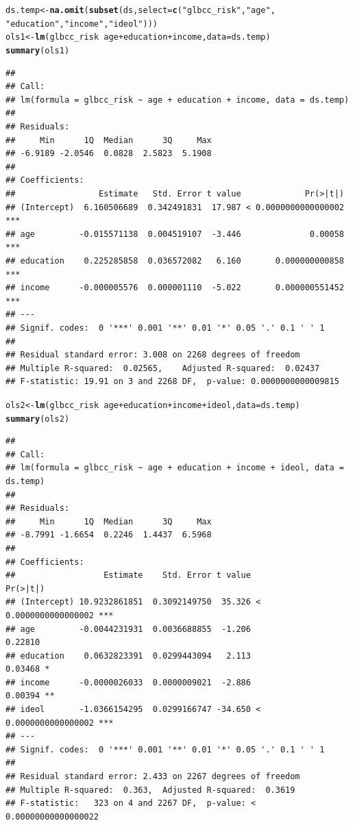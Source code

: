 \documentclass[11pt,openany]{book}\usepackage[]{graphicx}\usepackage[]{color}
\makeatletter
\newcommand{\hlstr}[1]{\textcolor[rgb]{0.192,0.494,0.8}{#1}}%
\newcommand{\hlopt}[1]{\textcolor[rgb]{0,0,0}{#1}}%
\newcommand{\hlstd}[1]{\textcolor[rgb]{0.345,0.345,0.345}{#1}}%
\newcommand{\hlkwb}[1]{\textcolor[rgb]{0.69,0.353,0.396}{#1}}%
\newcommand{\hlkwc}[1]{\textcolor[rgb]{0.333,0.667,0.333}{#1}}%
\newcommand{\hlkwd}[1]{\textcolor[rgb]{0.737,0.353,0.396}{\textbf{#1}}}%
\newenvironment{kframe}{%
 \def\at@end@of@kframe{}%
 \ifinner\ifhmode%
  \def\at@end@of@kframe{\end{minipage}}%
  \begin{minipage}{\columnwidth}%
 \fi\fi%
 \def\FrameCommand##1{\hskip\@totalleftmargin \hskip-\fboxsep
 \colorbox{shadecolor}{##1}\hskip-\fboxsep
     \hskip-\linewidth \hskip-\@totalleftmargin \hskip\columnwidth}%
 \MakeFramed {\advance\hsize-\width
   \@totalleftmargin\z@ \linewidth\hsize
   \@setminipage}}%
 {\par\unskip\endMakeFramed%
 \at@end@of@kframe}
\newenvironment{knitrout}{}{} %
\renewenvironment{knitrout}{\begin{singlespace}}{\end{singlespace}}
\makeatother
\begin{document}
\begin{knitrout}
\color{fgcolor}\begin{kframe}
\begin{alltt}
\hlstd{ds.temp} \hlkwb{<-} \hlkwd{na.omit}\hlstd{(}\hlkwd{subset}\hlstd{(ds,} \hlkwc{select} \hlstd{=} \hlkwd{c}\hlstd{(}\hlstr{"glbcc_risk"}\hlstd{,} \hlstr{"age"}\hlstd{,}
    \hlstr{"education"}\hlstd{,} \hlstr{"income"}\hlstd{,} \hlstr{"ideol"}\hlstd{)))}
\hlstd{ols1} \hlkwb{<-} \hlkwd{lm}\hlstd{(glbcc_risk} \hlopt{~} \hlstd{age} \hlopt{+} \hlstd{education} \hlopt{+} \hlstd{income,} \hlkwc{data} \hlstd{= ds.temp)}
\hlkwd{summary}\hlstd{(ols1)}
\end{alltt}
\begin{verbatim}
## 
## Call:
## lm(formula = glbcc_risk ~ age + education + income, data = ds.temp)
## 
## Residuals:
##     Min      1Q  Median      3Q     Max 
## -6.9189 -2.0546  0.0828  2.5823  5.1908 
## 
## Coefficients:
##                 Estimate   Std. Error t value             Pr(>|t|)    
## (Intercept)  6.160506689  0.342491831  17.987 < 0.0000000000000002 ***
## age         -0.015571138  0.004519107  -3.446              0.00058 ***
## education    0.225285858  0.036572082   6.160       0.000000000858 ***
## income      -0.000005576  0.000001110  -5.022       0.000000551452 ***
## ---
## Signif. codes:  0 '***' 0.001 '**' 0.01 '*' 0.05 '.' 0.1 ' ' 1
## 
## Residual standard error: 3.008 on 2268 degrees of freedom
## Multiple R-squared:  0.02565,	Adjusted R-squared:  0.02437 
## F-statistic: 19.91 on 3 and 2268 DF,  p-value: 0.0000000000009815
\end{verbatim}
\begin{alltt}
\hlstd{ols2} \hlkwb{<-} \hlkwd{lm}\hlstd{(glbcc_risk} \hlopt{~} \hlstd{age} \hlopt{+} \hlstd{education} \hlopt{+} \hlstd{income} \hlopt{+} \hlstd{ideol,} \hlkwc{data} \hlstd{= ds.temp)}
\hlkwd{summary}\hlstd{(ols2)}
\end{alltt}
\begin{verbatim}
## 
## Call:
## lm(formula = glbcc_risk ~ age + education + income + ideol, data = ds.temp)
## 
## Residuals:
##     Min      1Q  Median      3Q     Max 
## -8.7991 -1.6654  0.2246  1.4437  6.5968 
## 
## Coefficients:
##                  Estimate    Std. Error t value             Pr(>|t|)    
## (Intercept) 10.9232861851  0.3092149750  35.326 < 0.0000000000000002 ***
## age         -0.0044231931  0.0036688855  -1.206              0.22810    
## education    0.0632823391  0.0299443094   2.113              0.03468 *  
## income      -0.0000026033  0.0000009021  -2.886              0.00394 ** 
## ideol       -1.0366154295  0.0299166747 -34.650 < 0.0000000000000002 ***
## ---
## Signif. codes:  0 '***' 0.001 '**' 0.01 '*' 0.05 '.' 0.1 ' ' 1
## 
## Residual standard error: 2.433 on 2267 degrees of freedom
## Multiple R-squared:  0.363,	Adjusted R-squared:  0.3619 
## F-statistic:   323 on 4 and 2267 DF,  p-value: < 0.00000000000000022
\end{verbatim}
\end{kframe}
\end{knitrout}
\end{document}
